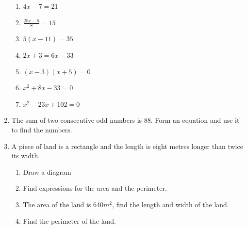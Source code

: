 \documentclass[a4paper,12pt]{article}
\begin{document}
\begin{enumerate}
\begin{multicols}{2}
	\begin{enumerate}[label=\normalsize \alph*)~~~, itemsep=0.4cm]
		\item $4x - 7 =21$ 
		\item $\displaystyle \frac{25x-5}{8} = 15$ 
		\item $5(x-11) =35$ 
		\item $2x+3 = 6x -33$ 
		\item $(x-3)(x+5)= 0$ 
		\item $x^2 + 8x -33=0$ 
		\item $x^2  - 23x +102=0$ 
	\end{enumerate}
\end{multicols}
\item The sum of two consecutive odd numbers is 88. Form an equation and use it to find the numbers. 
\item A piece of land is a rectangle and the length is eight metres longer than twice its width.
\begin{enumerate}
	\item Draw a diagram
	\item Find expressions for the area and the perimeter.
	\item The area of the land is 640$m^2$, find the length and width of the land.
	\item Find the perimeter of the land.
\end{enumerate}
\end{enumerate}
\end{document}
